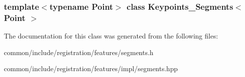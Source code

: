 \subsubsection*{template$<$typename Point$>$ class Keypoints\_\-Segments$<$ Point $>$}



The documentation for this class was generated from the following files:\begin{DoxyCompactItemize}
\item 
common/include/registration/features/segments.h\item 
common/include/registration/features/impl/segments.hpp\end{DoxyCompactItemize}
